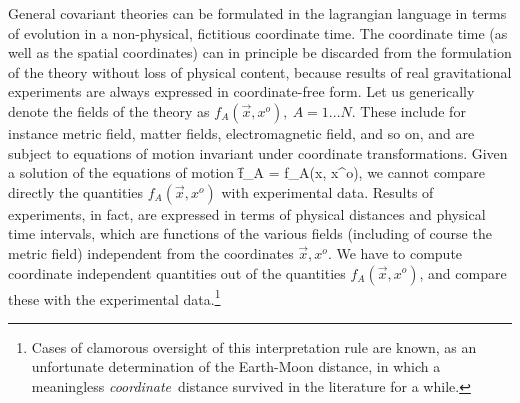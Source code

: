 General covariant theories can be formulated in the lagrangian
language in terms of evolution in a non-physical, fictitious
coordinate time.  The coordinate time (as well as the spatial
coordinates) can in principle be discarded from the formulation of
the theory without loss of physical content, because results of
real gravitational experiments are always expressed in
coordinate-free form.  Let us generically denote the fields of the
theory as $f_A(\vec x, x^o),\ A=1...N$.  These include for instance
metric field, matter fields, electromagnetic field, and so on, and
are subject to equations of motion invariant under coordinate
transformations. Given a solution of the equations of motion
\f
	f_A = f_A(\vec x, x^o), 				\label{fapar}
\ff
we cannot compare directly the quantities $f_A(\vec x, x^o)$ with
experimental data.  Results of experiments, in fact, are expressed
in terms of physical distances and physical time intervals, which
are functions of the various fields (including of course the metric
field) independent from the coordinates $\vec x, x^o$.  We have to
compute coordinate independent quantities out of the quantities
$f_A(\vec x, x^o)$, and compare these with the experimental
data.\footnote{Cases of clamorous oversight of this
interpretation rule are known, as an unfortunate determination of
the Earth-Moon distance, in which a meaningless {\it
coordinate\,} distance survived in the literature for a while.}

